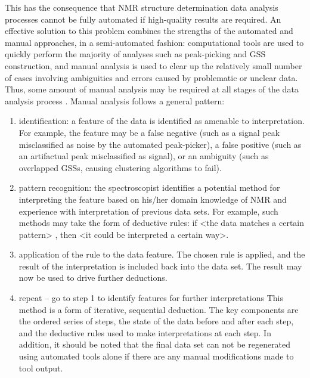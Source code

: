 This has the consequence that NMR structure determination data analysis 
processes cannot be fully automated if high-quality results are required.  
An effective solution to this problem combines the strengths of the automated 
and manual approaches, in a semi-automated fashion:  computational tools are 
used to quickly perform the majority of analyses such as peak-picking and 
GSS construction, and manual analysis is used to clear up the 
relatively small number of cases involving ambiguities and errors caused 
by problematic or unclear data.  Thus, some amount of manual analysis may 
be required at all stages of the data analysis process 
\cite{guntert2009automated, williamson2009automated}.   
Manual analysis follows a general pattern:
\begin{enumerate}
  \item identification: a feature of the data is identified as amenable to 
  interpretation.  For example, the feature may be a false negative (such as 
  a signal peak misclassified as noise by the automated peak-picker), a false 
  positive (such as an artifactual peak misclassified as signal), or an 
  ambiguity (such as overlapped GSSs, causing clustering algorithms to fail).
  \item pattern recognition: the spectroscopist identifies a potential method 
  for interpreting the feature based on his/her domain knowledge of NMR and 
  experience with interpretation of previous data sets.  For example, such 
  methods may take the form of deductive rules:  if <the data matches a 
  certain pattern> , then <it could be interpreted a certain way>.
  \item application of the rule to the data feature.  The chosen rule is 
  applied, and the result of the interpretation is included back into the 
  data set.  The result may now be used to drive further deductions.
  \item repeat -- go to step 1 to identify features for further interpretations
This method is a form of iterative, sequential deduction.  The key components 
are the ordered series of steps, the state of the data before and after each 
step, and the deductive rules used to make interpretations at each step.  In 
addition, it should be noted that the final data set can not be regenerated 
using automated tools alone if there are any manual modifications made to 
tool output.
\end{enumerate}


